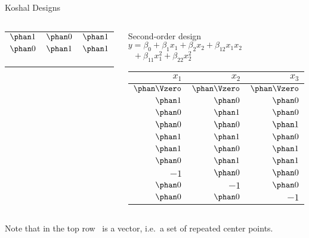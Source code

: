 \documentclass[9pt]{beamer}
\newcommand\lo{$-1$}
\newcommand\hi{$\phan1$}
\newcommand\ze{$\phan0$}
\newcommand\Ze{$\phan\Vzero$}
\begin{document}
\begin{frame}{Koshal Designs}
{\begin{columns}
\begin{column}{0.3\textwidth}
\begin{center}
\begin{tabular}{rrr}
			\hi & \ze & \hi \\
			\ze & \hi & \hi \\
			\bottomrule
			\\
			\\
			\\
		\end{tabular}
	\end{center}
\end{column}
\begin{column}{0.4\textwidth}
	\begin{center}
		Second-order design\\
		$y = \beta_0 + \beta_1x_1 + \beta_2x_2 + \beta_{12}x_1x_2$\\
				$\phantom{x} + \beta_{11}x_1^2 + \beta_{22}x_2^2$ \\
		\smallskip
		\begin{tabular}{rrr}
			\toprule
			$x_1$ & $x_2$ & $x_3$ \\
			\midrule
			\Ze & \Ze & \Ze \\
			\hi & \ze & \ze \\
			\ze & \hi & \ze \\
			\ze & \ze & \hi \\
			\hi & \hi & \ze \\
			\hi & \ze & \hi \\
			\ze & \hi & \hi \\
			\lo & \ze & \ze \\
			\ze & \lo & \ze \\
			\ze & \ze & \lo \\
			\bottomrule
		\end{tabular}
	\end{center}
\end{column}
\end{columns}
}
\bigskip
{\footnotesize Note that in the top row \Vzero\ is a vector, i.e.\ a set of repeated center points.}

\end{frame}
\end{document}
